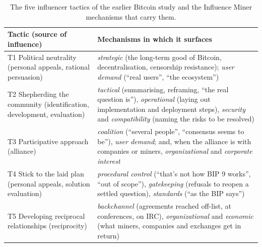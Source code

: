 \begin{table}[t]
\caption{The five influencer tactics of the earlier Bitcoin study \cite{thapa2021bitcoin} and the Influence Miner mechanisms that carry them.}
\label{tab:icis}
\footnotesize
\begin{tabular}{p{}p{}}
\toprule
Tactic (source of influence) & Mechanisms in which it surfaces \\
\midrule
T1 Political neutrality (personal appeals, rational persuasion) & \emph{strategic} (the long-term good of Bitcoin, decentralisation, censorship resistance); \emph{user demand} (``real users'', ``the ecosystem'') \\
T2 Shepherding the community (identification, development, evaluation) & \emph{tactical} (summarising, reframing, ``the real question is''), \emph{operational} (laying out implementation and deployment steps), \emph{security} and \emph{compatibility} (naming the risks to be resolved) \\
T3 Participative approach (alliance) & \emph{coalition} (``several people'', ``consensus seems to be''), \emph{user demand}; and, when the alliance is with companies or miners, \emph{organizational} and \emph{corporate interest} \\
T4 Stick to the laid plan (personal appeals, solution evaluation) & \emph{procedural control} (``that's not how BIP 9 works'', ``out of scope''), \emph{gatekeeping} (refusals to reopen a settled question), \emph{standards} (``as the BIP says'') \\
T5 Developing reciprocal relationships (reciprocity) & \emph{backchannel} (agreements reached off-list, at conferences, on IRC), \emph{organizational} and \emph{economic} (what miners, companies and exchanges get in return) \\
\bottomrule
\end{tabular}
\end{table}

